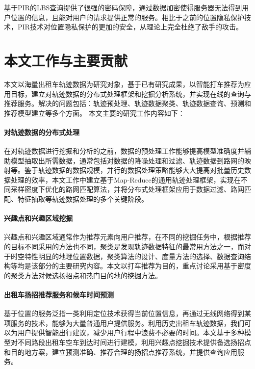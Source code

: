 基于PIR的LBS查询提供了很强的密码保障，通过数据加密使得服务器无法得到用户位置的信息，且能对用户的请求提供正常的服务。相比于之前的位置隐私保护技术，PIR技术对位置隐私保护的更加的安全，从理论上完全杜绝了敌手的攻击。


\section{本文工作与主要贡献}

本文以海量出租车轨迹数据为研究对象，基于已有研究成果，以智能打车推荐为应用目标，建立对轨迹数据的分布式处理框架和挖掘分析系统，并实现在线的查询与推荐服务。解决的问题包括：轨迹预处理、轨迹数据聚类、轨迹数据查询、预测和推荐模型建立等多个方面。
本文主要的研究工作内容如下：

\paragraph{对轨迹数据的分布式处理}

在对轨迹数据进行挖掘和分析的之前，数据的预处理工作能够提高模型准确度并辅助模型抽取出所需数据，通常包括对数据的降噪处理和过滤、轨迹数据到路网的映射等。鉴于轨迹数据的数据规模，并行的数据处理策略能够大大提高对批量历史数据处理的效率，本文工作中建立基于Map-Reduce的通用轨迹处理框架，实现在不同采样密度下优化的路网匹配算法，并将分布式处理框架应用于数据过滤、路网匹配、特征抽取等轨迹数据处理的多个关键阶段。

\paragraph{兴趣点和兴趣区域挖掘}

兴趣点和兴趣区域通常作为推荐元素向用户推荐，在不同的挖掘任务中，根据推荐的目标不同采用的方法也不同，聚类是发现轨迹数据特征的最常用方法之一，而对于时空特性明显的地理位置数据，聚类算法的设计、度量方法的选择、数据查询结构等均是该部分的主要研究内容。本文以打车推荐为目的，重点讨论采用基于密度的聚类方法对候选扬招点和热门目的地的挖掘方法。

\paragraph{出租车扬招推荐服务和候车时间预测}

基于位置的服务泛指一类利用定位技术获得当前位置信息，再通过无线网络得到某项服务的技术，能够为大量普通用户提供服务。利用历史出租车轨迹数据，我们可以为用户提供智能出行建议，减少用户行程中浪费不必要的时间。本文基于多种模型对不同路段出租车空车到达时间进行建模，利用兴趣点挖掘技术提供备选扬招点和目的地方案，建立预测准确、推荐合理的扬招点推荐系统，并提供查询应用服务。


